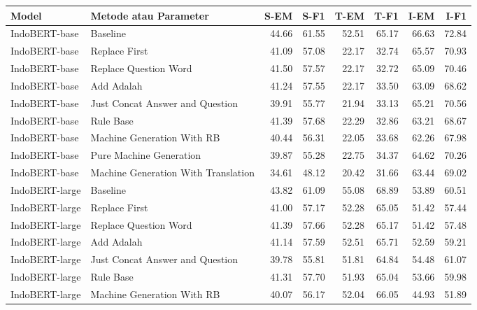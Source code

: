 \begin{table}[H]\centering
\scriptsize
\begin{tabular}{llrrrrrr}
\toprule
         Model &                              Metode atau Parameter &  S-EM &  S-F1 &  T-EM &  T-F1 &  I-EM &  I-F1 \\
\midrule
 IndoBERT-base &                            Baseline & 44.66 & 61.55 & 52.51 & 65.17 & 66.63 & 72.84 \\
 IndoBERT-base &                       Replace First & 41.09 & 57.08 & 22.17 & 32.74 & 65.57 & 70.93 \\
 IndoBERT-base &               Replace Question Word & 41.50 & 57.57 & 22.17 & 32.72 & 65.09 & 70.46 \\
 IndoBERT-base &                          Add Adalah & 41.24 & 57.55 & 22.17 & 33.50 & 63.09 & 68.62 \\
 IndoBERT-base &     Just Concat Answer and Question & 39.91 & 55.77 & 21.94 & 33.13 & 65.21 & 70.56 \\
 IndoBERT-base &                           Rule Base & 41.39 & 57.68 & 22.29 & 32.86 & 63.21 & 68.67 \\
 IndoBERT-base &          Machine Generation With RB & 40.44 & 56.31 & 22.05 & 33.68 & 62.26 & 67.98 \\
 IndoBERT-base &             Pure Machine Generation & 39.87 & 55.28 & 22.75 & 34.37 & 64.62 & 70.26 \\
 IndoBERT-base & Machine Generation With Translation & 34.61 & 48.12 & 20.42 & 31.66 & 63.44 & 69.02 \\
\hline
IndoBERT-large &                            Baseline & 43.82 & 61.09 & 55.08 & 68.89 & 53.89 & 60.51 \\
IndoBERT-large &                       Replace First & 41.00 & 57.17 & 52.28 & 65.05 & 51.42 & 57.44 \\
IndoBERT-large &               Replace Question Word & 41.39 & 57.66 & 52.28 & 65.17 & 51.42 & 57.48 \\
IndoBERT-large &                          Add Adalah & 41.14 & 57.59 & 52.51 & 65.71 & 52.59 & 59.21 \\
IndoBERT-large &     Just Concat Answer and Question & 39.78 & 55.81 & 51.81 & 64.84 & 54.48 & 61.07 \\
IndoBERT-large &                           Rule Base & 41.31 & 57.70 & 51.93 & 65.04 & 53.66 & 59.98 \\
IndoBERT-large &          Machine Generation With RB & 40.07 & 56.17 & 52.04 & 66.05 & 44.93 & 51.89 \\

\end{tabular}
\end{table}
